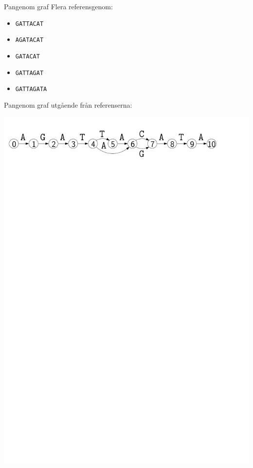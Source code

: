 \documentclass[11pt, aspectratio=169, table]{beamer}
\begin{document}
\begin{frame}{Pangenom graf}
Flera referensgenom:
\begin{itemize}
\item {\tt GATTACAT}
\item {\tt AGATACAT}
\item {\tt GATACAT}
\item {\tt GATTAGAT}
\item {\tt GATTAGATA}
\end{itemize}

\vfill

Pangenom graf utgående från referenserna:
\begin{center}
\includegraphics[width=.9\textwidth]{graph.pdf}
\end{center}
\end{frame}
\end{document}
